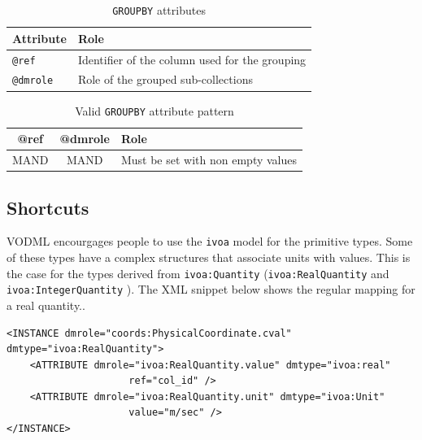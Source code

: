 \documentclass[11pt,a4paper]{ivoa}
\begin{document}
\begin{table}[!htbp]
\small
\centering
\begin{tabulary}{\linewidth}{|L|J|}
       \hline
           \textbf{Attribute} &  
           \textbf{Role} \\
       \hline  \hline
           \texttt{@ref}    & 
           Identifier of the column used for the grouping \\       
        \hline 
           \texttt{@dmrole}    & 
           Role of the grouped sub-collections\\       
        \hline 
\end{tabulary}
\caption{\texttt{GROUPBY} attributes} 
\label{tbl:group-att}
\end{table}

\begin{table}[!htbp]
\small
\centering
\begin{tabulary}{\linewidth}{|C|C|J|}
       \hline
           \textbf{@ref} & 
           \textbf{@dmrole} &  
           \textbf{Role} \\
        \hline   \hline
           MAND    &                       
           MAND    &            
           Must be set with non empty values \\       
       \hline 
\end{tabulary}
\caption{Valid \texttt{GROUPBY} attribute pattern} 
\label{tbl:group-patterns}
\end{table}
\FloatBarrier

%
%

\subsection{Shortcuts}
VODML encourgages people to use the \texttt{ivoa} model for the primitive types. 
Some of these types have a complex structures that associate units with values. 
This is the case for the types derived from \texttt{ivoa:Quantity} (\texttt{ivoa:RealQuantity} and \texttt{ivoa:IntegerQuantity} ).
The XML snippet below shows the regular mapping for a real quantity..

\begin{lstlisting}[caption={ivoa:RealQuantity example},style=XML]
<INSTANCE dmrole="coords:PhysicalCoordinate.cval"
dmtype="ivoa:RealQuantity">
    <ATTRIBUTE dmrole="ivoa:RealQuantity.value" dmtype="ivoa:real"
                     ref="col_id" />
    <ATTRIBUTE dmrole="ivoa:RealQuantity.unit" dmtype="ivoa:Unit"
                     value="m/sec" />
</INSTANCE>
\end{lstlisting}
\end{document}
